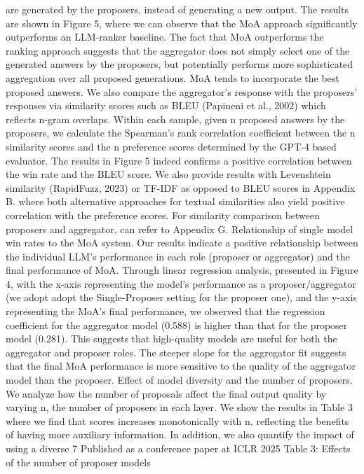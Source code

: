 are generated by the proposers, instead of generating a new output. The results are shown in Figure 5,
where we can observe that the MoA approach significantly outperforms an LLM-ranker baseline.
The fact that MoA outperforms the ranking approach suggests that the aggregator does not simply
select one of the generated answers by the proposers, but potentially performs more sophisticated
aggregation over all proposed generations.
MoA tends to incorporate the best proposed answers.
We also compare the aggregator’s response
with the proposers’ responses via similarity scores such as BLEU (Papineni et al., 2002) which reflects
n-gram overlaps. Within each sample, given n proposed answers by the proposers, we calculate
the Spearman’s rank correlation coefficient between the n similarity scores and the n preference
scores determined by the GPT-4 based evaluator. The results in Figure 5 indeed confirms a positive
correlation between the win rate and the BLEU score. We also provide results with Levenshtein
similarity (RapidFuzz, 2023) or TF-IDF as opposed to BLEU scores in Appendix B. where both
alternative approaches for textual similarities also yield positive correlation with the preference scores.
For similarity comparison between proposers and aggregator, can refer to Appendix G.
Relationship of single model win rates to the MoA system.
Our results indicate a positive
relationship between the individual LLM’s performance in each role (proposer or aggregator) and the
final performance of MoA. Through linear regression analysis, presented in Figure 4, with the x-axis
representing the model’s performance as a proposer/aggregator (we adopt adopt the Single-Proposer
setting for the proposer one), and the y-axis representing the MoA’s final performance, we observed
that the regression coefficient for the aggregator model (0.588) is higher than that for the proposer
model (0.281). This suggests that high-quality models are useful for both the aggregator and proposer
roles. The steeper slope for the aggregator fit suggests that the final MoA performance is more
sensitive to the quality of the aggregator model than the proposer.
Effect of model diversity and the number of proposers.
We analyze how the number of proposals
affect the final output quality by varying n, the number of proposers in each layer. We show the
results in Table 3 where we find that scores increases monotonically with n, reflecting the benefits
of having more auxiliary information. In addition, we also quantify the impact of using a diverse
7
Published as a conference paper at ICLR 2025
Table 3: Effects of the number of proposer models
